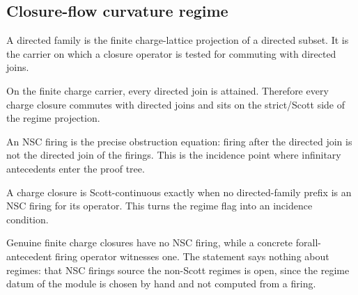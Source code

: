 \subsection{Closure-flow curvature regime}

\begin{proposition}\label{thm:directed-family-carrier}\leanok{}
A directed family is the finite charge-lattice projection of a directed subset.
It is the carrier on which a closure operator is tested for commuting with
directed joins.
\end{proposition}

\begin{theorem}\label{thm:finite-scott-continuous}\leanok{}
On the finite charge carrier, every directed join is attained.  Therefore every
charge closure commutes with directed joins and sits on the strict/Scott side
of the regime projection.
\end{theorem}

\begin{proposition}\label{thm:nsc-firing-carrier}\leanok{}
An NSC firing is the precise obstruction equation: firing after the directed
join is not the directed join of the firings.  This is the incidence point
where infinitary antecedents enter the proof tree.
\end{proposition}

\begin{theorem}\label{thm:scott-continuous-iff-no-nsc-firing}\leanok{}
A charge closure is Scott-continuous exactly when no directed-family prefix is
an NSC firing for its operator.  This turns the regime flag into an incidence
condition.
\end{theorem}

\begin{theorem}\label{thm:nsc-firing-source-of-aperiodic}\leanok{}
Genuine finite charge closures have no NSC firing, while a concrete
forall-antecedent firing operator witnesses one.  The statement says nothing about
regimes: that NSC firings source the non-Scott regimes is open, since the regime
datum of the module is chosen by hand and not computed from a firing.
\end{theorem}

